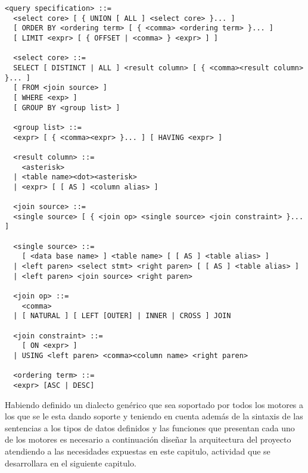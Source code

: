 \begin{Verbatim}[frame=single, label=sintaxis para SELECT]
  <query specification> ::=
  <select core> [ { UNION [ ALL ] <select core> }... ]
  [ ORDER BY <ordering term> [ { <comma> <ordering term> }... ]
  [ LIMIT <expr> [ { OFFSET | <comma> } <expr> ] ]
  
  <select core> ::=
  SELECT [ DISTINCT | ALL ] <result column> [ { <comma><result column> }... ] 
  [ FROM <join source> ]
  [ WHERE <exp> ]
  [ GROUP BY <group list> ]
  
  <group list> ::=
  <expr> [ { <comma><expr> }... ] [ HAVING <expr> ]
  
  <result column> ::=
    <asterisk>
  | <table name><dot><asterisk>
  | <expr> [ [ AS ] <column alias> ]
  
  <join source> ::=
  <single source> [ { <join op> <single source> <join constraint> }... ]
  
  <single source> ::=
    [ <data base name> ] <table name> [ [ AS ] <table alias> ]
  | <left paren> <select stmt> <right paren> [ [ AS ] <table alias> ]
  | <left paren> <join source> <right paren>

  <join op> ::=
    <comma>
  | [ NATURAL ] [ LEFT [OUTER] | INNER | CROSS ] JOIN
  
  <join constraint> ::=
    [ ON <expr> ]
  | USING <left paren> <comma><column name> <right paren>
  
  <ordering term> ::=
  <expr> [ASC | DESC]
\end{Verbatim}

Habiendo definido un dialecto genérico que sea soportado por todos los motores a los que se le esta dando soporte y teniendo en cuenta además de la sintaxis de las sentencias a los tipos de datos definidos y las funciones que presentan cada uno de los motores es necesario a continuación diseñar la arquitectura del proyecto atendiendo a las necesidades expuestas en este capitulo, actividad que se desarrollara en el siguiente capitulo.